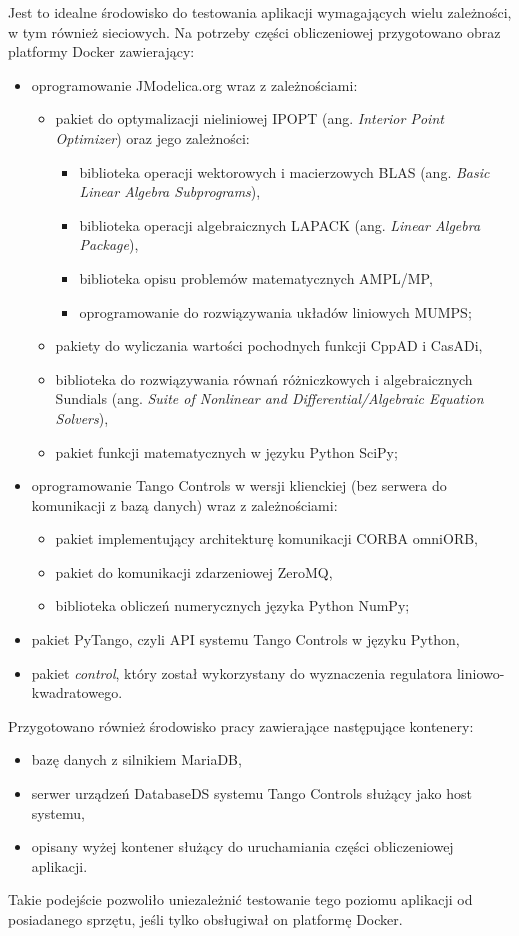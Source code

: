 Jest to idealne środowisko do testowania aplikacji wymagających wielu zależności, w tym również sieciowych. Na potrzeby części obliczeniowej przygotowano obraz platformy Docker zawierający:
\begin{itemize}
    \item oprogramowanie JModelica.org wraz z zależnościami:
    \begin{itemize}
        \item pakiet do optymalizacji nieliniowej IPOPT (ang. \emph{Interior Point Optimizer}) oraz jego zależności:
        \begin{itemize}
            \item biblioteka operacji wektorowych i macierzowych BLAS (ang. \emph{Basic Linear Algebra Subprograms}),
            \item biblioteka operacji algebraicznych LAPACK (ang. \emph{Linear Algebra Package}),
            \item biblioteka opisu problemów matematycznych AMPL/MP,
            \item oprogramowanie do rozwiązywania układów liniowych MUMPS;
        \end{itemize}
        \item pakiety do wyliczania wartości pochodnych funkcji CppAD i CasADi,
        \item biblioteka do rozwiązywania równań różniczkowych i algebraicznych Sundials (ang. \emph{Suite of Nonlinear and Differential/Algebraic Equation Solvers}),
        \item pakiet funkcji matematycznych w języku Python SciPy;
    \end{itemize}
    \item oprogramowanie Tango Controls w wersji klienckiej (bez serwera do komunikacji z bazą danych) wraz z zależnościami:
    \begin{itemize}
        \item pakiet implementujący architekturę komunikacji CORBA omniORB,
        \item pakiet do komunikacji zdarzeniowej ZeroMQ,
        \item biblioteka obliczeń numerycznych języka Python NumPy;
    \end{itemize}
    \item pakiet PyTango, czyli API systemu Tango Controls w języku Python,
    \item pakiet \emph{control}, który został wykorzystany do wyznaczenia regulatora liniowo-kwadratowego.
\end{itemize}

Przygotowano również środowisko pracy zawierające następujące kontenery:
\begin{itemize}
    \item bazę danych z silnikiem MariaDB,
    \item serwer urządzeń DatabaseDS systemu Tango Controls służący jako host systemu,
    \item opisany wyżej kontener służący do uruchamiania części obliczeniowej aplikacji.
\end{itemize}

Takie podejście pozwoliło uniezależnić testowanie tego poziomu aplikacji od posiadanego sprzętu, jeśli tylko obsługiwał on platformę Docker.
